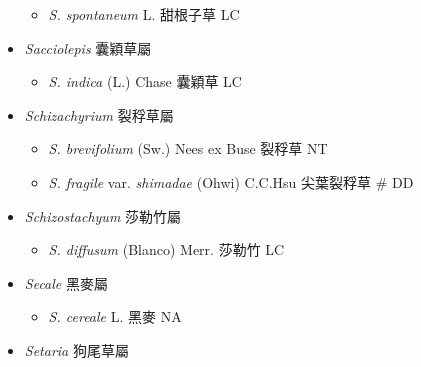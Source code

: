 \begin{itemize}
  \begin{itemize}
        \item[] \textit{S. spontaneum} L.  甜根子草   LC
  \end{itemize}
 \item[] \textit{Sacciolepis} 囊穎草屬
                                
  \begin{itemize}
        \item[] \textit{S. indica} (L.) Chase  囊穎草   LC
  \end{itemize}
 \item[] \textit{Schizachyrium} 裂稃草屬
                                
  \begin{itemize}
        \item[] \textit{S. brevifolium} (Sw.) Nees ex Buse  裂稃草   NT
        \item[] \textit{S. fragile} var. \textit{shimadae} (Ohwi) C.C.Hsu  尖葉裂稃草  \# DD
  \end{itemize}
 \item[] \textit{Schizostachyum} 莎勒竹屬
                                
  \begin{itemize}
        \item[] \textit{S. diffusum} (Blanco) Merr.  莎勒竹   LC
  \end{itemize}
 \item[] \textit{Secale} 黑麥屬
                                
  \begin{itemize}
        \item[] \textit{S. cereale} L.  黑麥   NA
  \end{itemize}
 \item[] \textit{Setaria} 狗尾草屬
                                

\end{itemize}
